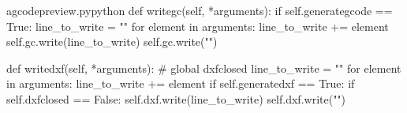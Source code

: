 \documentclass{ltxdoc}
\begin{document}
\lstset{firstnumber=\thegcpy}
\begin{writecode}{a}{gcodepreview.py}{python}
    def writegc(self, *arguments):
        if self.generategcode == True:
            line_to_write = ""
            for element in arguments:
                line_to_write += element
            self.gc.write(line_to_write)
            self.gc.write("\n")

    def writedxf(self, *arguments):
#        global dxfclosed
        line_to_write = ""
        for element in arguments:
            line_to_write += element
        if self.generatedxf == True:
            if self.dxfclosed == False:
                self.dxf.write(line_to_write)
                self.dxf.write("\n")

\end{writecode}
\addtocounter{gcpy}{18}

%
\end{document}
